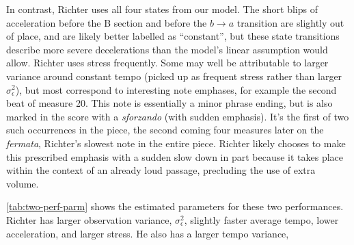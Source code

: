 \documentclass[aoas]{imsart}
\begin{document}
In contrast, Richter uses all four states from our model. The short
blips of acceleration before the B section and before the
$b \rightarrow a$ transition are slightly out of place, and are
likely better labelled as ``constant'', but these state transitions
describe more severe decelerations than the model's linear
assumption would allow. Richter uses stress frequently. Some may well be
attributable to larger variance around constant tempo (picked up as
frequent stress rather than larger $\sigma^2_\epsilon$), but most
correspond to interesting note emphases, for example the second beat
of measure 20. This note is essentially a minor phrase ending, but is
also marked in the score with a {\em sforzando} (with sudden
emphasis). It's the first of two such occurrences in the piece, the
second coming four measures later on the {\em fermata}, Richter's slowest
note in the entire piece. Richter likely chooses to make this
prescribed emphasis with a sudden slow down in part because it takes
place within the context of an already loud passage, precluding the
use of extra volume.
\begin{table}[tb]
  \centering
  \caption{The estimated parameters for performances by Richter and
    Hatto.}
\label{tab:two-perf-parm}
\end{table}
\autoref{tab:two-perf-parm} shows the estimated parameters for these
two performances. Richter has larger observation variance,
$\sigma^2_{\epsilon}$, slightly faster average tempo, lower
acceleration, and larger stress. He also has a larger tempo variance,
\end{document}

